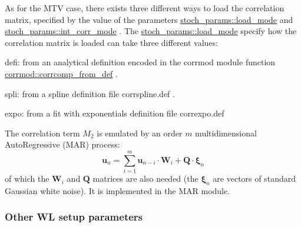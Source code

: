 As for the M\+TV case, there exists three different ways to load the correlation matrix, specified by the value of the parameters \hyperlink{namespacestoch__params_ac61a48744a1bb015b5148c421837fbe7}{stoch\+\_\+params\+::load\+\_\+mode} and \hyperlink{namespacestoch__params_ab901db3992a4df88db5a67fdd7be6ac6}{stoch\+\_\+params\+::int\+\_\+corr\+\_\+mode} . The \hyperlink{namespacestoch__params_ac61a48744a1bb015b5148c421837fbe7}{stoch\+\_\+params\+::load\+\_\+mode} specify how the correlation matrix is loaded can take three different values\+:
\begin{DoxyItemize}
\item \textquotesingle{}defi\textquotesingle{}\+: from an analytical definition encoded in the corrmod module function \hyperlink{namespacecorrmod_a52bbdab69c73b4313857d71c07cb3164}{corrmod\+::corrcomp\+\_\+from\+\_\+def} .
\item \textquotesingle{}spli\textquotesingle{}\+: from a spline definition file \textquotesingle{}corrspline.\+def\textquotesingle{} .
\item \textquotesingle{}expo\textquotesingle{}\+: from a fit with exponentials definition file \textquotesingle{}correxpo.\+def\textquotesingle{}
\end{DoxyItemize}

The correlation term $M_2$ is emulated by an order $m$ multidimensional Auto\+Regressive (M\+AR) process\+: \[ \boldsymbol u_n = \sum_{i=1}^m \boldsymbol u_{n-i} \cdot \boldsymbol W_i + \boldsymbol Q \cdot \boldsymbol\xi_n \] of which the $\boldsymbol W_i$ and $\boldsymbol Q$ matrices are also needed (the $\boldsymbol\xi_n$ are vectors of standard Gaussian white noise). It is implemented in the M\+AR module.

\subsubsection*{Other WL setup parameters}

